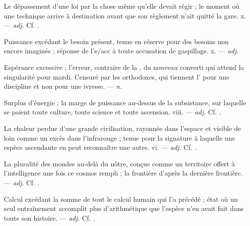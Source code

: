  Le dépassement d'une loi par la chose même qu'elle devait régir ; le moment où une technique arrive à destination avant que son règlement n'ait quitté la gare.   x. ---  \textit{adj.} Cf. .

 Puissance excédant le besoin présent, tenue en réserve pour des besoins non encore imaginés ; réponse de l'e/acc à toute accusation de gaspillage.   x. ---  \textit{adj.}

 Espérance excessive ; l'erreur, contraire de la , du nouveau converti qui attend la singularité pour mardi. Censuré par les orthodoxes, qui tiennent l' pour une discipline et non pour une ivresse. ---  \textit{n.}

 Surplus d'énergie ; la marge de puissance au-dessus de la subsistance, sur laquelle se paient toute culture, toute science et toute ascension.   viii. ---  \textit{adj.} Cf. .

 La chaleur perdue d'une grande civilisation, rayonnée dans l'espace et visible de loin comme un excès dans l'infrarouge ; tenue pour la signature à laquelle une espèce ascendante en peut reconnaître une autre.   vi. ---  \textit{adj.} Cf. .

 La pluralité des mondes au-delà du nôtre, conçue comme un territoire offert à l'intelligence une fois ce cosmos rempli ; la frontière d'après la dernière frontière. ---  \textit{adj.} Cf. .

 Calcul excédant la somme de tout le calcul humain qui l'a précédé ; état où un seul entraînement accomplit plus d'arithmétique que l'espèce n'en avait fait dans toute son histoire. ---  \textit{adj.} Cf. .

